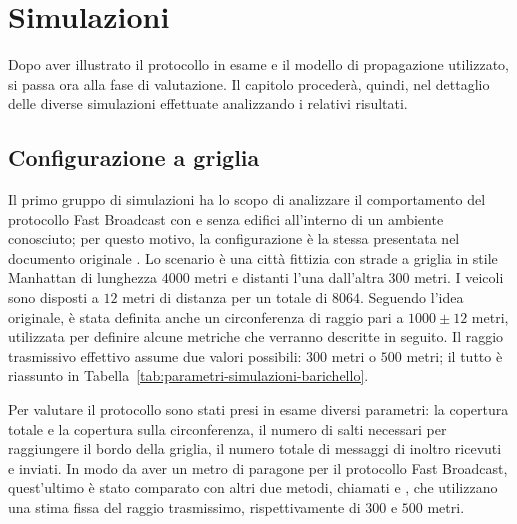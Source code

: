 
\chapter{Simulazioni}\label{chap:simulazioni}
Dopo aver illustrato il protocollo in esame e il modello di propagazione utilizzato, si passa ora alla fase di valutazione.
Il capitolo procederà, quindi, nel dettaglio delle diverse simulazioni effettuate analizzando i relativi risultati.
%
\section{Configurazione a griglia}\label{sec:configurazione-griglia}
Il primo gruppo di simulazioni ha lo scopo di analizzare il comportamento del protocollo Fast Broadcast con e senza edifici all'interno
di un ambiente conosciuto;
per questo motivo, la configurazione è la stessa presentata nel documento originale \cite{Barichello2017propagazione}.
Lo scenario è una città fittizia con strade a griglia in stile Manhattan di lunghezza $4000$ metri e distanti l'una dall'altra $300$ metri.
I veicoli sono disposti a $12$ metri di distanza per un totale di $8064$.
Seguendo l'idea originale, è stata definita anche un circonferenza di raggio pari a $1000\pm12$ metri, utilizzata per definire alcune metriche che verranno descritte in seguito.
Il raggio trasmissivo effettivo assume due valori possibili: $300$ metri o $500$ metri;
il tutto è riassunto in Tabella~\ref{tab:parametri-simulazioni-barichello}.

Per valutare il protocollo sono stati presi in esame diversi parametri: la copertura totale e la copertura sulla circonferenza,
il numero di salti necessari per raggiungere il bordo della griglia, il numero totale di messaggi di inoltro ricevuti e inviati.
In modo da aver un metro di paragone per il protocollo Fast Broadcast, quest'ultimo è stato comparato con altri due metodi, chiamati \statica e \staticb,
che utilizzano una stima fissa del raggio trasmissimo, rispettivamente di $300$ e $500$ metri.

